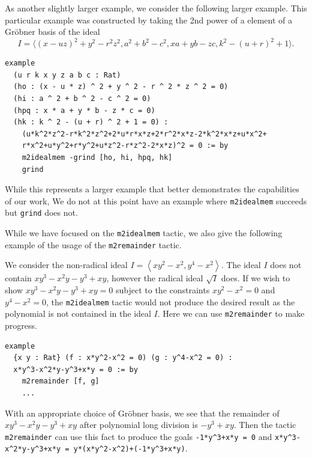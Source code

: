 \documentclass[runningheads]{llncs}
\begin{document}
\begin{example}
  As another slightly larger example, we consider the following larger example. This particular example was constructed by taking the 2nd power of a element of a Gr\"{o}bner basis of the ideal \[I =\langle (x - u z) ^ 2 + y ^ 2 - r ^ 2 z ^ 2, a ^ 2 + b ^ 2 - c ^ 2,  x  a + y b - z c, k ^ 2 - (u + r) ^ 2 + 1 \rangle.\]

\begin{verbatim}
example
  (u r k x y z a b c : Rat)
  (ho : (x - u * z) ^ 2 + y ^ 2 - r ^ 2 * z ^ 2 = 0)
  (hi : a ^ 2 + b ^ 2 - c ^ 2 = 0)
  (hpq : x * a + y * b - z * c = 0)
  (hk : k ^ 2 - (u + r) ^ 2 + 1 = 0) :
    (u*k^2*z^2-r*k^2*z^2+2*u*r*x*z+2*r^2*x*z-2*k^2*x*z+u*x^2+
    r*x^2+u*y^2+r*y^2+u*z^2-r*z^2-2*x*z)^2 = 0 := by
    m2idealmem -grind [ho, hi, hpq, hk]
    grind
\end{verbatim}

While this represents a larger example that better demonstrates the capabilities of our work, We do not at this point have an example where \verb|m2idealmem| succeeds but \verb|grind| does not.

\end{example}

While we have focused on the \verb|m2idealmem| tactic, we also give the following example of the usage of the \verb|m2remainder| tactic.
\begin{example}

  We consider the non-radical ideal $I = \left<xy^2-x^2, y^4-x^2\right>$. The ideal $I$ does not contain $xy^3  - x^2y - y^3  + xy$, however the radical ideal $\sqrt{I}$ does. If we wish to show $xy^3-x^2y-y^3+xy=0$ subject to the constraints $xy^2-x^2=0$ and $y^4-x^2=0$, the \verb|m2idealmem| tactic would not produce the desired result as the polynomial is not contained in the ideal $I$. Here we can use \verb|m2remainder| to make progress.

\begin{verbatim}
example
  {x y : Rat} (f : x*y^2-x^2 = 0) (g : y^4-x^2 = 0) :
  x*y^3-x^2*y-y^3+x*y = 0 := by
    m2remainder [f, g]
    ...
\end{verbatim}

  With an appropriate choice of Gr\"{o}bner basis, we see that the remainder of $xy^3  - x^2y - y^3  + xy$ after polynomial long division is $-y^3+xy$. Then the tactic \verb|m2remainder| can use this fact to produce the goals \verb|-1*y^3+x*y = 0|
  and
  \verb|x*y^3-x^2*y-y^3+x*y = y*(x*y^2-x^2)+(-1*y^3+x*y)|.
\end{example}
\end{document}
